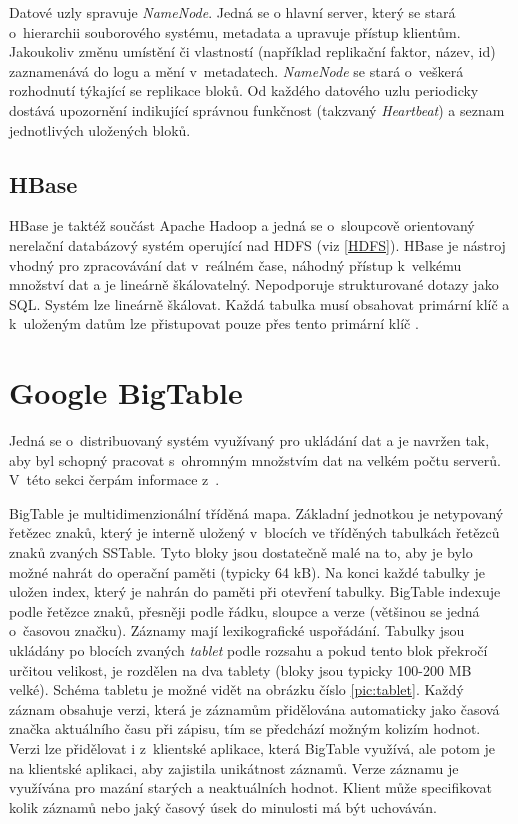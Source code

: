 Datové uzly spravuje \textit{NameNode}. Jedná se o hlavní server, který se stará o~hierarchii souborového systému, metadata a upravuje přístup klientům. Jakoukoliv změnu umístění či vlastností (například replikační faktor, název, id) zaznamenává do logu a mění v~metadatech. \textit{NameNode} se stará o~veškerá rozhodnutí týkající se replikace bloků. Od každého datového uzlu periodicky dostává upozornění indikující správnou funkčnost (takzvaný \textit{Heartbeat}) a seznam jednotlivých uložených bloků. 


\subsection{HBase} \label{Hbase}
HBase je taktéž součást Apache Hadoop a jedná se o~sloupcově orientovaný nerelační databázový systém operující nad HDFS (viz \ref{HDFS}). HBase je nástroj vhodný pro zpracovávání dat v~reálném čase, náhodný přístup k~velkému množství dat a je lineárně škálovatelný. Nepodporuje strukturované dotazy jako SQL. Systém lze lineárně škálovat. Každá tabulka musí obsahovat primární klíč a k~uloženým datům lze přistupovat pouze přes tento primární klíč \cite{HBase}.

\section{Google BigTable}\label{sec:bigtable}
Jedná se o~distribuovaný systém využívaný pro ukládání dat a je navržen tak, aby byl schopný pracovat s~ohromným množstvím dat na velkém počtu serverů. V~této sekci čerpám informace z~\cite{BigTable}.

BigTable je multidimenzionální tříděná mapa. Základní jednotkou je netypovaný řetězec znaků, který je interně uložený v~blocích ve tříděných tabulkách řetězců znaků zvaných SSTable. Tyto bloky jsou dostatečně malé na to, aby je bylo možné nahrát do operační paměti (typicky 64 kB). Na konci každé tabulky je uložen index, který je nahrán do paměti při otevření tabulky. BigTable indexuje podle řetězce znaků, přesněji podle řádku, sloupce a verze (většinou se jedná o~časovou značku). Záznamy mají lexikografické uspořádání. Tabulky jsou ukládány po blocích zvaných \textit{tablet} podle rozsahu a pokud tento blok překročí určitou velikost, je rozdělen na dva tablety (bloky jsou typicky 100-200 MB velké). Schéma tabletu je možné vidět na obrázku číslo \ref{pic:tablet}. Každý záznam obsahuje verzi, která je záznamům přidělována automaticky jako časová značka aktuálního času při zápisu, tím se předchází možným kolizím hodnot. Verzi lze přidělovat i z~klientské aplikace, která BigTable využívá, ale potom je na klientské aplikaci, aby zajistila unikátnost záznamů. Verze záznamu je využívána pro mazání starých a neaktuálních hodnot. Klient může specifikovat kolik záznamů nebo jaký časový úsek do minulosti má být uchováván.

